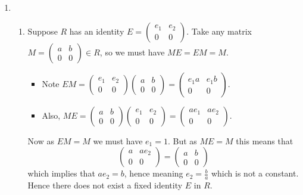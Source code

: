 \begin{enumerate}
    \item \begin{enumerate}[label=(\roman*)]
        \item Suppose $R$ has an identity $E = \begin{pmatrix}e_1&e_2\\0&0\end{pmatrix}$. Take any matrix $M = \begin{pmatrix}a&b\\0&0\end{pmatrix} \in R$, so we must have $ME = EM = M$.
        \begin{itemize}
            \item Note $EM = \begin{pmatrix}e_1&e_2\\0&0\end{pmatrix}\begin{pmatrix}a&b\\0&0\end{pmatrix} = \begin{pmatrix}e_1a&e_1b\\0&0\end{pmatrix}$.
            \item Also, $ME = \begin{pmatrix}a&b\\0&0\end{pmatrix}\begin{pmatrix}e_1&e_2\\0&0\end{pmatrix} = \begin{pmatrix}ae_1&ae_2\\0&0\end{pmatrix}$.
        \end{itemize}
        Now as $EM = M$ we must have $e_1 = 1$. But as $ME = M$ this means that
        \[
            \begin{pmatrix}a&ae_2\\0&0\end{pmatrix} = \begin{pmatrix}a&b\\0&0\end{pmatrix}
        \]
        which implies that $ae_2 = b$, hence meaning $e_2 = \frac{b}{a}$ which is not a constant. Hence there does not exist a fixed identity $E$ in $R$.


\end{enumerate}
\end{enumerate}
